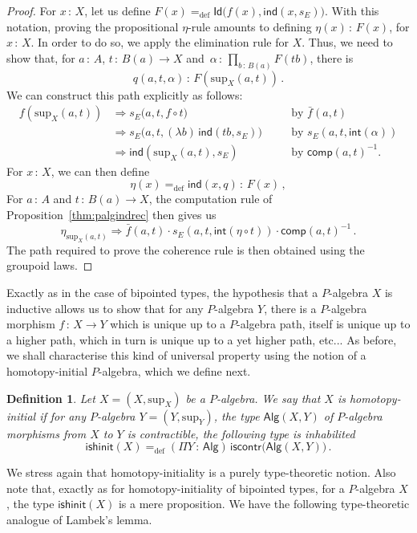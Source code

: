 \documentclass[10pt,a4paper,oneside,reqno]{amsart}
\theoremstyle{mythm}
\theoremstyle{mydef}
\newtheorem{definition}[theorem]{Definition}
\theoremstyle{myrmk}
\newcommand{\ie}{\text{i.e.\ }}
\newcommand{\by}[1]{\quad&&\text{by {$#1$}}}
\newcommand{\defeq}{=_{\mathrm{def}}}
\newcommand{\co}{\,{:}\,}
\newcommand{\iscontr}{\mathsf{iscontr}}
\newcommand{\isalghinit}{\mathsf{ishinit}}
\renewcommand{\int}{\mathsf{int}}
\newcommand{\Id}{\mathsf{Id}}
\newcommand{\ind}{\mathsf{ind}}
\newcommand{\comp}{\mathsf{comp}}
\newcommand{\Palg}{\mathsf{Alg}}
\renewcommand{\sup}{\mathrm{sup}}
\begin{document}
\begin{proof} For $x \co X$, let us define $F(x) \defeq \Id \big(   f(x), \ind(x,s_E))$. With this notation, proving
 the propositional $\eta$-rule amounts to defining $\eta(x) \co F(x)$, for $x \co X$. In order to do so, we apply
the elimination rule for $X$. Thus, we need to show that, for $a \co A$, $t \co B(a) \to X$ and~$\alpha \co \prod_{b \co B(a)} F(tb)$, there 
is 
\[
q(a,t,\alpha) \co   F(\sup_X(a,t)) \, .
\]
We can construct this path explicitly as follows:
\begin{align*}
f(\sup_X(a,t)) &\Rightarrow s_E\big(a,t, f \circ t  \big)   \by{\bar{f}(a,t)}\\
	&\Rightarrow s_E\big(a,t, (\lambda b)\, \ind(t b,s_E) \big) \by{s_E(a,t,\int(\alpha))}\\
	& \Rightarrow \ind(\sup_X(a,t),s_E) \by{\comp(a,t)^{-1}}.
\end{align*}
For $x \co X$, we can then define
\[
\eta(x) \defeq \ind(x,q) \co F(x) \, ,
\] 
For $a \co A$ and $t \co B(a) \to X$, the  computation rule of Proposition~\ref{thm:palgindrec} then gives us
\[
 \eta_{\sup_X(a,t)} \Rightarrow  \bar{f}(a,t) \cdot s_E(a,t,\int(  \eta \circ t ))  \cdot  \comp(a,t)^{-1} \, .
\]
The path required to prove  the coherence rule is then obtained using the groupoid laws.
\end{proof}

Exactly as in the case of bipointed types, the hypothesis that a $P$-algebra $X$ is inductive allows us to show that for any
$P$-algebra $Y$, there is a $P$-algebra morphism $f \co X \to Y$ which is unique up to a $P$-algebra path, itself is unique up 
to a higher path, which in turn is unique up to a yet higher path, etc... As before, we shall characterise this kind of universal property
using the notion of a homotopy-initial $P$-algebra, which we define next.

\begin{definition}\label{def:AlgInit}
Let $X = (X, \sup_X)$ be a $P$-algebra. We say that $X$ is  \emph{homotopy-initial}  if for any $P$-algebra 
$Y = (Y, \sup_Y)$, the type $\Palg(X,Y)$ of $P$-algebra morphisms from $X$ to $Y$
is contractible, \ie the following type is inhabilited
\[
\isalghinit(X) \defeq
 (\Pi Y \co \Palg)  \, \iscontr \big( \Palg(X,Y) \big)  \, .
\]  
\end{definition}

We stress again that homotopy-initiality is a purely type-theoretic notion. Also note that, exactly as for 
homotopy-initiality of bipointed types, for a $P$-algebra $X$, the type
$\isalghinit(X)$ is a mere proposition. 
We have the following type-theoretic analogue of Lambek's lemma.
\end{document}
